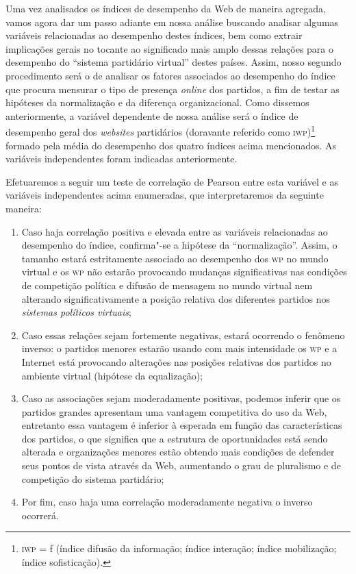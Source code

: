 Uma vez analisados os índices de desempenho da Web de maneira agregada,
vamos agora dar um passo adiante em nossa análise buscando analisar
algumas variáveis relacionadas ao desempenho destes índices, bem como
extrair implicações gerais no tocante ao significado mais amplo dessas
relações para o desempenho do ``sistema partidário virtual'' destes
países. Assim, nosso segundo procedimento será o de analisar os fatores
associados ao desempenho do índice que procura mensurar o tipo de
presença \textit{online} dos partidos, a fim de testar as hipóteses da
normalização e da diferença organizacional. Como dissemos anteriormente,
a variável dependente de nossa análise será o índice de desempenho geral
dos \textit{websites} partidários (doravante referido como \textsc{iwp})\footnote{\textsc{iwp} = f (índice difusão da informação; índice interação; índice
mobilização; índice sofisticação).} formado pela
média do desempenho dos quatro índices acima mencionados. As variáveis
independentes foram indicadas anteriormente.

Efetuaremos a seguir um teste de correlação de Pearson entre esta
variável e as variáveis independentes acima enumeradas, que
interpretaremos da seguinte maneira: 

\begin{enumerate}
\item Caso haja correlação positiva e
elevada entre as variáveis relacionadas ao desempenho do índice,
confirma"-se a hipótese da ``normalização''. Assim, o tamanho estará
estritamente associado ao desempenho dos \textsc{wp} no mundo virtual e os \textsc{wp} não
estarão provocando mudanças significativas nas condições de competição
política e difusão de mensagem no mundo virtual nem alterando
significativamente a posição relativa dos diferentes partidos nos
\textit{sistemas políticos virtuais}; 

\item Caso essas relações sejam fortemente
negativas, estará ocorrendo o fenômeno inverso: o partidos menores
estarão usando com mais intensidade os \textsc{wp} e a Internet está provocando
alterações nas posições relativas dos partidos no ambiente virtual
(hipótese da equalização); 

\item Caso as associações sejam moderadamente
positivas, podemos inferir que os partidos grandes apresentam uma
vantagem competitiva do uso da Web, entretanto essa vantagem é inferior
à esperada em função das características dos partidos, o que significa
que a estrutura de oportunidades está sendo alterada e organizações
menores estão obtendo mais condições de defender seus pontos de vista
através da Web, aumentando o grau de pluralismo e de competição do
sistema partidário; 

\item Por fim, caso haja uma correlação moderadamente
negativa o inverso ocorrerá.
\end{enumerate}

